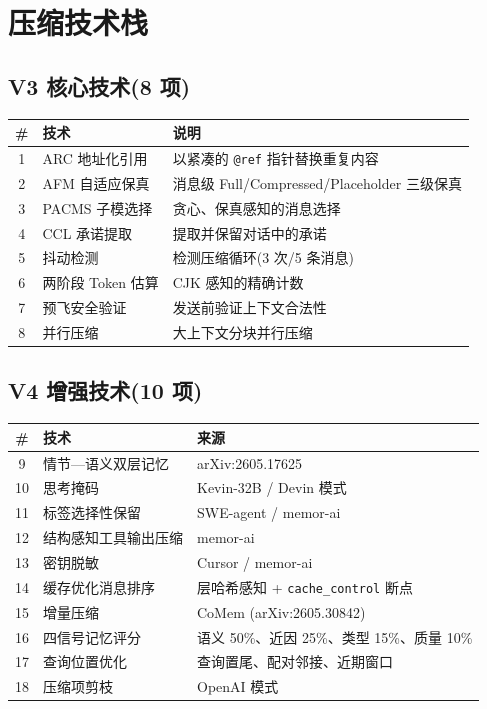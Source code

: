 \documentclass[11pt,a4paper]{article}
\begin{document}
\section{压缩技术栈}

\subsection{V3 核心技术(8 项)}

\begin{table}[h]
  \centering
  \begin{tabular}{@{}clp{9cm}@{}}
    \toprule
    \# & 技术 & 说明 \\
    \midrule
    1  & ARC 地址化引用 & 以紧凑的 \texttt{@ref} 指针替换重复内容 \\
    2  & AFM 自适应保真 & 消息级 Full/Compressed/Placeholder 三级保真 \\
    3  & PACMS 子模选择 & 贪心、保真感知的消息选择 \\
    4  & CCL 承诺提取 & 提取并保留对话中的承诺 \\
    5  & 抖动检测 & 检测压缩循环(3 次/5 条消息) \\
    6  & 两阶段 Token 估算 & CJK 感知的精确计数 \\
    7  & 预飞安全验证 & 发送前验证上下文合法性 \\
    8  & 并行压缩 & 大上下文分块并行压缩 \\
    \bottomrule
  \end{tabular}
\end{table}

\subsection{V4 增强技术(10 项)}

\begin{table}[h]
  \centering
  \begin{tabular}{@{}clp{8cm}@{}}
    \toprule
    \# & 技术 & 来源 \\
    \midrule
    9  & 情节—语义双层记忆 & arXiv:2605.17625 \\
    10 & 思考掩码 & Kevin-32B / Devin 模式 \\
    11 & 标签选择性保留 & SWE-agent / memor-ai \\
    12 & 结构感知工具输出压缩 & memor-ai \\
    13 & 密钥脱敏 & Cursor / memor-ai \\
    14 & 缓存优化消息排序 & 层哈希感知 + \texttt{cache\_control} 断点 \\
    15 & 增量压缩 & CoMem (arXiv:2605.30842) \\
    16 & 四信号记忆评分 & 语义 50\%、近因 25\%、类型 15\%、质量 10\% \\
    17 & 查询位置优化 & 查询置尾、配对邻接、近期窗口 \\
    18 & 压缩项剪枝 & OpenAI 模式 \\
    \bottomrule
  \end{tabular}
\end{table}
\end{document}
